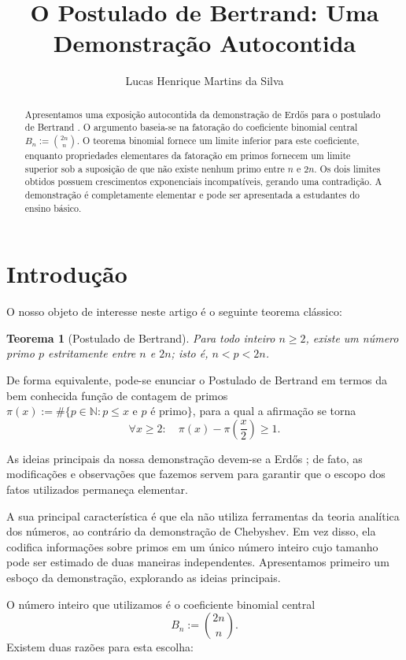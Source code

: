 \documentclass[11pt]{article}
\title{\textbf{O Postulado de Bertrand: Uma Demonstração Autocontida}}
\author{Lucas Henrique Martins da Silva}
\date{}
\newtheorem{theorem}{Teorema}[section]
\theoremstyle{remark}
\newcommand{\vs}{\vspace{10px}}
\begin{document}
\maketitle

\begin{abstract}
Apresentamos uma exposição autocontida da demonstração de Erd\H{o}s para o postulado de Bertrand \cite{Erdos1932Tschebyschef}. O argumento baseia-se na fatoração do coeficiente binomial central $B_n:=\binom{2n}{n}$. O teorema binomial fornece um limite inferior para este coeficiente, enquanto propriedades elementares da fatoração em primos fornecem um limite superior sob a suposição de que não existe nenhum primo entre $n$ e $2n$. Os dois limites obtidos possuem crescimentos exponenciais incompatíveis, gerando uma contradição. A demonstração é completamente elementar e pode ser apresentada a estudantes do ensino básico.
\end{abstract}

\section{Introdução}
O nosso objeto de interesse neste artigo é o seguinte teorema clássico:

\begin{theorem}[Postulado de Bertrand]
    Para todo inteiro $n\geq 2$, existe um número primo $p$ estritamente entre $n$ e $2n$; isto é, $n<p<2n$. 
\end{theorem}

De forma equivalente, pode-se enunciar o Postulado de Bertrand em termos da bem conhecida função de contagem de primos  
$\pi(x):=\#\{p\in \mathbb N: p\le x \text{ e } p \text{ é primo}\}$,
para a qual a afirmação se torna \[\forall x\ge 2:\quad \pi(x)-\pi\left(\frac x2\right)\ge 1.\]
\vs 

As ideias principais da nossa demonstração devem-se a Erd\H{o}s \cite{Erdos1932Tschebyschef}; de fato, as modificações e observações que fazemos servem para garantir que o escopo dos fatos utilizados permaneça elementar.

A sua principal característica é que ela não utiliza ferramentas da teoria analítica dos números, ao contrário da demonstração de Chebyshev. Em vez disso, ela codifica informações sobre primos em um único número inteiro cujo tamanho pode ser estimado de duas maneiras independentes. Apresentamos primeiro um esboço da demonstração, explorando as ideias principais.
\vs

O número inteiro que utilizamos é o coeficiente binomial central \[B_n:=\binom{2n}{n}.\]
Existem duas razões para esta escolha:
\end{document}

